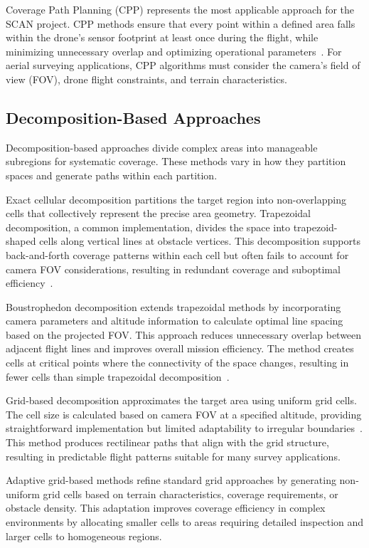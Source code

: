 Coverage Path Planning (CPP) represents the most applicable approach for the SCAN project. CPP methods ensure that every point within a defined area falls within the drone's sensor footprint at least once during the flight, while minimizing unnecessary overlap and optimizing operational parameters~\cite{SmoothCoverage}. For aerial surveying applications, CPP algorithms must consider the camera's field of view (FOV), drone flight constraints, and terrain characteristics.

\subsection{Decomposition-Based Approaches}

Decomposition-based approaches divide complex areas into manageable subregions for systematic coverage. These methods vary in how they partition spaces and generate paths within each partition.

Exact cellular decomposition partitions the target region into non-overlapping cells that collectively represent the precise area geometry. Trapezoidal decomposition, a common implementation, divides the space into trapezoid-shaped cells along vertical lines at obstacle vertices. This decomposition supports back-and-forth coverage patterns within each cell but often fails to account for camera FOV considerations, resulting in redundant coverage and suboptimal efficiency~\cite{cabreira2019survey}.

Boustrophedon decomposition extends trapezoidal methods by incorporating camera parameters and altitude information to calculate optimal line spacing based on the projected FOV. This approach reduces unnecessary overlap between adjacent flight lines and improves overall mission efficiency. The method creates cells at critical points where the connectivity of the space changes, resulting in fewer cells than simple trapezoidal decomposition~\cite{cabreira2019survey}.

Grid-based decomposition approximates the target area using uniform grid cells. The cell size is calculated based on camera FOV at a specified altitude, providing straightforward implementation but limited adaptability to irregular boundaries~\cite{MathworksUAV}. This method produces rectilinear paths that align with the grid structure, resulting in predictable flight patterns suitable for many survey applications.

Adaptive grid-based methods refine standard grid approaches by generating non-uniform grid cells based on terrain characteristics, coverage requirements, or obstacle density. This adaptation improves coverage efficiency in complex environments by allocating smaller cells to areas requiring detailed inspection and larger cells to homogeneous regions.

